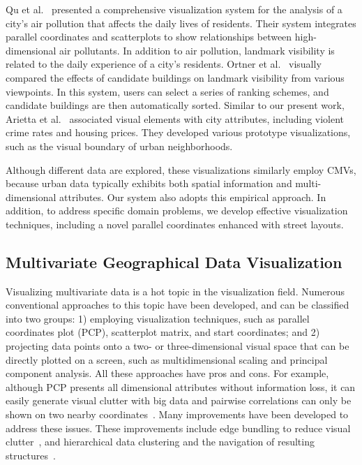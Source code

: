 Qu et al.~\cite{qu2007visual} presented a comprehensive visualization system for the analysis of a city's air pollution that affects the daily lives of residents.
Their system integrates parallel coordinates and scatterplots to show relationships between high-dimensional air pollutants.
In addition to air pollution, landmark visibility is related to the daily experience of a city's residents.
Ortner et al.~\cite{ortner2016vis} visually compared the effects of candidate buildings on landmark visibility from various viewpoints.
In this system, users can select a series of ranking schemes, and candidate buildings are then automatically sorted.
Similar to our present work, Arietta et al.~\cite{arietta2014city} associated visual elements with city attributes, including violent crime rates and housing prices.
They developed various prototype visualizations, such as the visual boundary of urban neighborhoods.

Although different data are explored, these visualizations similarly employ CMVs, because urban data typically exhibits both spatial information and multi-dimensional attributes.
Our system also adopts this empirical approach.
In addition, to address specific domain problems, we develop effective visualization techniques, including a novel parallel coordinates enhanced with street layouts.

\subsection{Multivariate Geographical Data Visualization}
Visualizing multivariate data is a hot topic in the visualization field.
Numerous conventional approaches to this topic have been developed, and can be classified into two groups:
1) employing visualization techniques, such as parallel coordinates plot (PCP), scatterplot matrix, and start coordinates;
and 2) projecting data points onto a two- or three-dimensional visual space that can be directly plotted on a screen, such as multidimensional scaling and principal component analysis.
All these approaches have pros and cons.
For example, although PCP presents all dimensional attributes without information loss, it can easily generate visual clutter with big data and pairwise correlations can only be shown on two nearby coordinates~\cite{heinrich_2012_state}.
Many improvements have been developed to address these issues.
These improvements include edge bundling to reduce visual clutter~\cite{zhou2008visual, holten2010evaluation}, and hierarchical data clustering and the navigation of resulting structures~\cite{fua1999hierarchical, zhao_2012_structure}.

